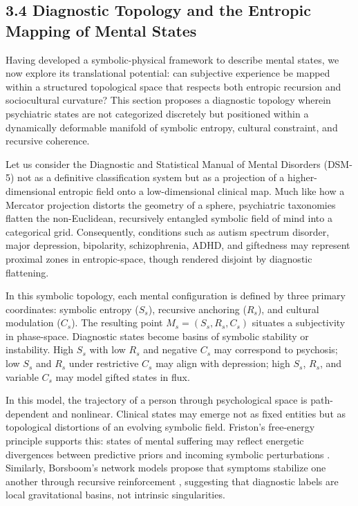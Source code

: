 \subsection*{3.4 Diagnostic Topology and the Entropic Mapping of Mental States}

Having developed a symbolic-physical framework to describe mental states, we now explore its translational potential: can subjective experience be mapped within a structured topological space that respects both entropic recursion and sociocultural curvature? This section proposes a diagnostic topology wherein psychiatric states are not categorized discretely but positioned within a dynamically deformable manifold of symbolic entropy, cultural constraint, and recursive coherence.

Let us consider the Diagnostic and Statistical Manual of Mental Disorders (DSM-5) not as a definitive classification system but as a projection of a higher-dimensional entropic field onto a low-dimensional clinical map. Much like how a Mercator projection distorts the geometry of a sphere, psychiatric taxonomies flatten the non-Euclidean, recursively entangled symbolic field of mind into a categorical grid. Consequently, conditions such as autism spectrum disorder, major depression, bipolarity, schizophrenia, ADHD, and giftedness may represent proximal zones in entropic-space, though rendered disjoint by diagnostic flattening.

In this symbolic topology, each mental configuration is defined by three primary coordinates: symbolic entropy (\( S_s \)), recursive anchoring (\( R_s \)), and cultural modulation (\( C_s \)). The resulting point \( M_s = (S_s, R_s, C_s) \) situates a subjectivity in phase-space. Diagnostic states become basins of symbolic stability or instability. High \( S_s \) with low \( R_s \) and negative \( C_s \) may correspond to psychosis; low \( S_s \) and \( R_s \) under restrictive \( C_s \) may align with depression; high \( S_s \), \( R_s \), and variable \( C_s \) may model gifted states in flux.

In this model, the trajectory of a person through psychological space is path-dependent and nonlinear. Clinical states may emerge not as fixed entities but as topological distortions of an evolving symbolic field. Friston's free-energy principle supports this: states of mental suffering may reflect energetic divergences between predictive priors and incoming symbolic perturbations \cite{friston2010}. Similarly, Borsboom's network models propose that symptoms stabilize one another through recursive reinforcement \cite{borsboom2017}, suggesting that diagnostic labels are local gravitational basins, not intrinsic singularities.


